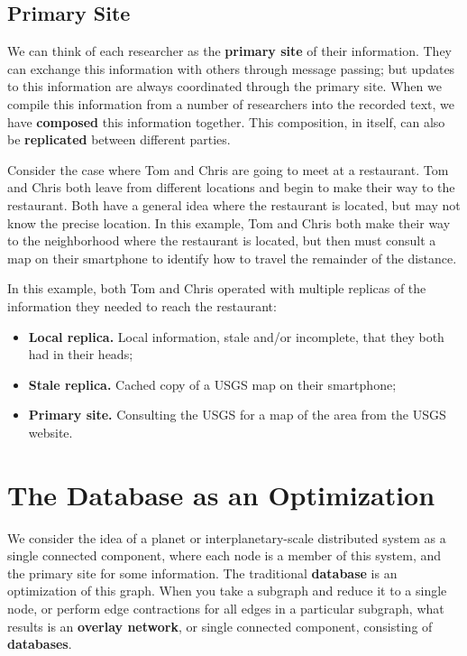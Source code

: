 \documentclass[english]{article}
\begin{document}
\subsection{Primary Site}
We can think of each researcher as the \textbf{primary site} of their information.  They can exchange this information with others through message passing; but updates to this information are always coordinated through the primary site.  When we compile this information from a number of researchers into the recorded text, we have \textbf{composed} this information together.  This composition, in itself, can also be \textbf{replicated} between different parties.  

Consider the case where Tom and Chris are going to meet at a restaurant.  Tom and Chris both leave from different locations and begin to make their way to the restaurant.  Both have a general idea where the restaurant is located, but may not know the precise location.  In this example, Tom and Chris both make their way to the neighborhood where the restaurant is located, but then must consult a map on their smartphone to identify how to travel the remainder of the distance.

In this example, both Tom and Chris operated with multiple replicas of the information they needed to reach the restaurant:
\begin{itemize}
\item \textbf{Local replica.} Local information, stale and/or incomplete, that they both had in their heads;
\item \textbf{Stale replica.} Cached copy of a USGS map on their smartphone;
\item \textbf{Primary site.} Consulting the USGS for a map of the area from the USGS website.
\end{itemize}



\section{The Database as an Optimization}
We consider the idea of a planet or interplanetary-scale distributed system as a single connected component, where each node is a member of this system, and the primary site for some information.  The traditional \textbf{database} is an optimization of this graph.  When you take a subgraph and reduce it to a single node, or perform edge contractions for all edges in a particular subgraph, what results is an \textbf{overlay network}, or single connected component, consisting of \textbf{databases}.
\end{document}
